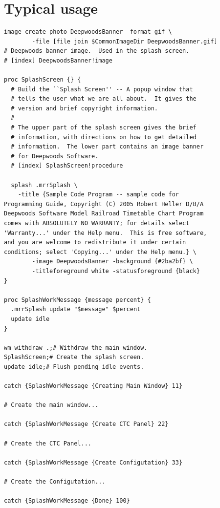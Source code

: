 \section{Typical usage}

\begin{lstlisting}[caption={Typical usage},label={lst:SPL:typicalUsage}]
image create photo DeepwoodsBanner -format gif \
        -file [file join $CommonImageDir DeepwoodsBanner.gif]
# Deepwoods banner image.  Used in the splash screen.
# [index] DeepwoodsBanner!image

proc SplashScreen {} {
  # Build the ``Splash Screen'' -- A popup window that 
  # tells the user what we are all about.  It gives the 
  # version and brief copyright information.
  #
  # The upper part of the splash screen gives the brief 
  # information, with directions on how to get detailed 
  # information.  The lower part contains an image banner 
  # for Deepwoods Software.
  # [index] SplashScreen!procedure

  splash .mrrSplash \
	-title {Sample Code Program -- sample code for 
Programming Guide, Copyright (C) 2005 Robert Heller D/B/A 
Deepwoods Software Model Railroad Timetable Chart Program 
comes with ABSOLUTELY NO WARRANTY; for details select 
'Warranty...' under the Help menu.  This is free software, 
and you are welcome to redistribute it under certain 
conditions; select 'Copying...' under the Help menu.} \
        -image DeepwoodsBanner -background {#2ba2bf} \
        -titleforeground white -statusforeground {black}
}

proc SplashWorkMessage {message percent} {
  .mrrSplash update "$message" $percent
  update idle
}

wm withdraw .;# Withdraw the main window.
SplashScreen;# Create the splash screen.
update idle;# Flush pending idle events.

catch {SplashWorkMessage {Creating Main Window} 11}

# Create the main window...

catch {SplashWorkMessage {Create CTC Panel} 22}

# Create the CTC Panel...

catch {SplashWorkMessage {Create Configutation} 33}

# Create the Configutation...

catch {SplashWorkMessage {Done} 100}

\end{lstlisting}
